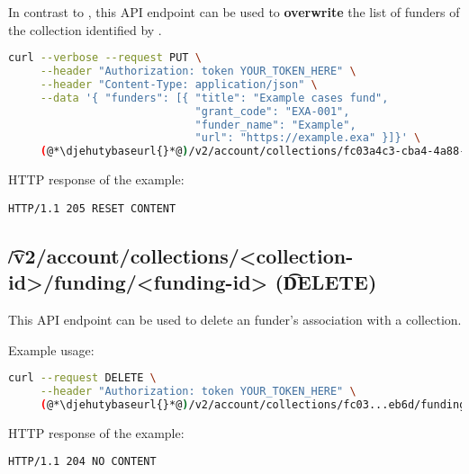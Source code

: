   In contrast to , this API endpoint
  can be used to \textbf{overwrite} the list of funders of the collection
  identified by .

\begin{lstlisting}[language=bash]
curl --verbose --request PUT \
     --header "Authorization: token YOUR_TOKEN_HERE" \
     --header "Content-Type: application/json" \
     --data '{ "funders": [{ "title": "Example cases fund",
                             "grant_code": "EXA-001",
                             "funder_name": "Example",
                             "url": "https://example.exa" }]}' \
     (@*\djehutybaseurl{}*@)/v2/account/collections/fc03a4c3-cba4-4a88-a8a6-eb38924eeb6d/funding
\end{lstlisting}

  HTTP response of the example:
\begin{lstlisting}
HTTP/1.1 205 RESET CONTENT
\end{lstlisting}

\subsection{\t{/v2/account/collections/<collection-id>/funding/<funding-id>} (\t{DELETE})}

  This API endpoint can be used to delete an funder's association with a collection.

  Example usage:
\begin{lstlisting}[language=bash]
curl --request DELETE \
     --header "Authorization: token YOUR_TOKEN_HERE" \
     (@*\djehutybaseurl{}*@)/v2/account/collections/fc03...eb6d/funding/9b43...e6cd
\end{lstlisting}

  HTTP response of the example:
\begin{lstlisting}
HTTP/1.1 204 NO CONTENT
\end{lstlisting}
